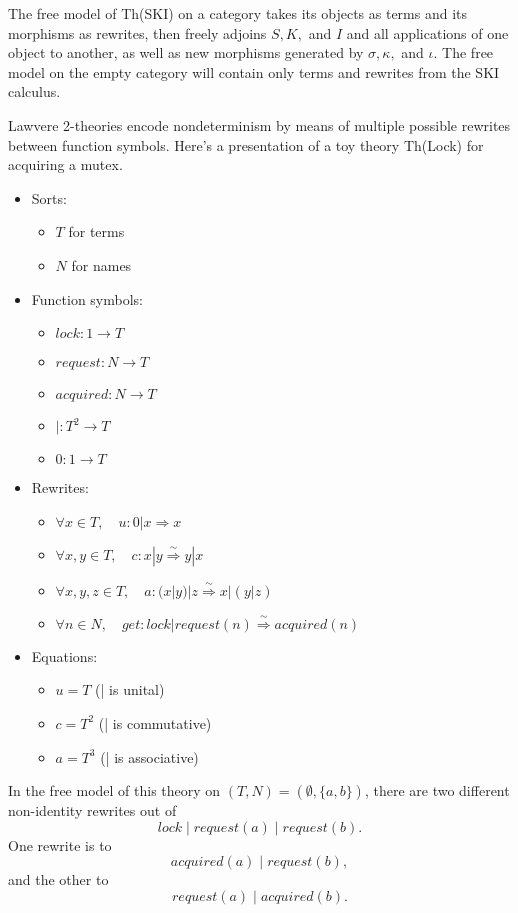 \documentclass{article}
\newcommand{\maps}{\colon}
\begin{document}
The free model of Th(SKI) on a category takes its objects as terms and its morphisms as rewrites, then freely adjoins $S,K,$ and $I$ and all applications of one object to another, as well as new morphisms generated by $\sigma,\kappa,$ and $\iota.$  The free model on the empty category will contain only terms and rewrites from the SKI calculus.

Lawvere 2-theories encode nondeterminism by means of multiple possible rewrites between function symbols.  Here's a presentation of a toy theory Th(Lock) for acquiring a mutex.
\begin{center}
  \begin{itemize}
    \item Sorts:
    \begin{itemize}
      \item $T$ for terms
      \item $N$ for names
    \end{itemize}
    \item Function symbols:
    \begin{itemize}
      \item $lock\maps 1 \to T$
      \item $request\maps N \to T$
      \item $acquired\maps N \to T$
      \item $|\maps T^2 \to T$
      \item $0 \maps 1 \to T$
    \end{itemize}
    \item Rewrites:
    \begin{itemize}
      \item $\forall x \in T, \quad u\maps 0|x \Rightarrow x$
      \item $\forall x,y \in T,\quad c\maps x|y \stackrel{\sim}{\Rightarrow} y|x$
      \item $\forall x,y,z \in T,\quad a\maps (x|y)|z \stackrel{\sim}{\Rightarrow} x|(y|z)$
      \item $\forall n \in N,\quad get\maps lock | request(n) \stackrel{\sim}{\Rightarrow} acquired(n)$
    \end{itemize}
    \item Equations:
    \begin{itemize}
      \item $u = T$ (| is unital)
      \item $c = T^2$ (| is commutative)
      \item $a = T^3$ (| is associative)
    \end{itemize}
  \end{itemize}
\end{center}
In the free model of this theory on $(T, N) = (\emptyset, \{ a,b\})$, there are two different non-identity rewrites out of
\[ lock \;|\; request(a) \;|\; request(b). \]
One rewrite is to
\[ acquired(a) \;|\; request(b), \]
and the other to
\[ request(a) \;|\; acquired(b). \]
\end{document}
